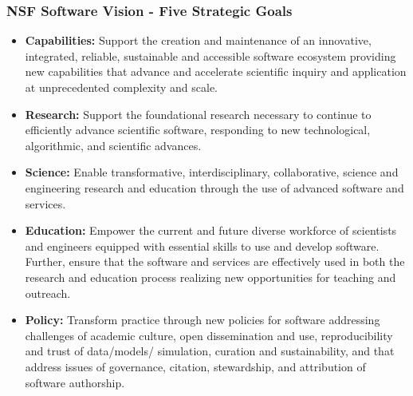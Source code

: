 \begin{frame}
\frametitle{NSF Software Vision - Five Strategic Goals}
\fontsize{11pt}{7.2}\selectfont
\begin{itemize}
\item {\bf Capabilities:} Support the creation and maintenance of an innovative, integrated, reliable, sustainable and accessible software ecosystem providing new capabilities that advance and accelerate scientific inquiry and application at unprecedented complexity and scale.
\item {\bf Research:} Support the foundational research necessary to continue to efficiently advance scientific software, responding to new technological, algorithmic, and scientific advances.
\item {\bf Science:} Enable transformative, interdisciplinary, collaborative, science and engineering research and education through the use of advanced software and services.
\item {\bf Education:} Empower the current and future diverse workforce of scientists and engineers equipped with essential skills to use and develop software. Further, ensure that the software and services are effectively used in both the research and education process realizing new opportunities for teaching and outreach.
\item {\bf Policy:} Transform practice through new policies for software addressing challenges of academic culture, open dissemination and use, reproducibility and trust of data/models/ simulation, curation and sustainability, and that address issues of governance, citation, stewardship, and attribution of software authorship.
\end{itemize}

\end{frame}


